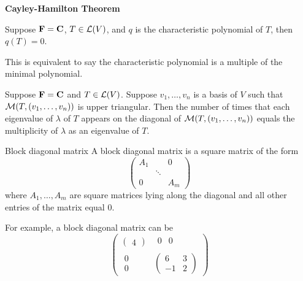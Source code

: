 \documentclass[12pt,a4paper]{article}
\begin{document}
    \begin{thm}
        \textbf{Cayley-Hamilton Theorem}

        Suppose $\mathbf{F}=\mathbf{C}$, $T\in\mathcal{L}(V)$, and $q$ is the characteristic polynomial of $T$, then $q(T)=0$.
    \end{thm}
    \begin{remark}
        This is equivalent to say the characteristic polynomial is a multiple of the minimal polynomial.
    \end{remark}
    \hfill

    \begin{prop}\label{8.19}
        Suppose $\mathbf{F}=\mathbf{C}$ and $T\in\mathcal{L}(V)$. Suppose $v_1,\dots,v_n$ is a basis of $V$ such that $\mathcal{M}(T,(v_1,\dots,v_n))$ is upper triangular. Then the number of times that each eigenvalue of $\lambda$ of $T$ appears on the diagonal of $\mathcal{M}(T,(v_1,\dots,v_n))$ equals the multiplicity of $\lambda$ as an eigenvalue of $T$.
    \end{prop}
    \hfill

    \begin{defi}{Block diagonal matrix}
        A block diagonal matrix is a square matrix of the form
        $$
        \begin{pmatrix}
            A_1 & & 0\\
             &\ddots& \\
             0 & & A_m
        \end{pmatrix}
        $$
        where $A_1,\dots,A_m$ are square matrices lying along the diagonal and all other entries of the matrix equal $0$.
    \end{defi}
    \begin{eg}
        For example, a block diagonal matrix can be
        $$
        \begin{pmatrix}
        \begin{pmatrix}4\end{pmatrix}&
        \begin{matrix}0 & 0 \\\end{matrix}\\
        \begin{matrix}0 \\ 0\end{matrix}&
        \begin{pmatrix}6 & 3 \\-1 & 2\end{pmatrix}
        \end{pmatrix}
        $$
    \end{eg}
    \hfill
    
\end{document}
